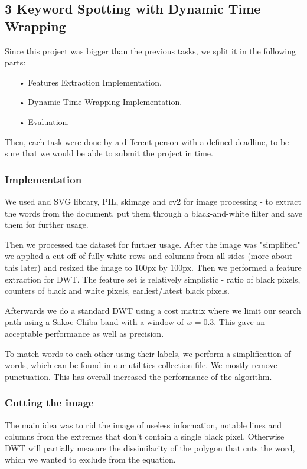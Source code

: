 \documentclass[12pt]{article}
\begin{document}
\subsection*{3 Keyword Spotting with Dynamic Time Wrapping}

Since this project was bigger than the previous tasks, we split it in the following parts:
\begin{enumerate}
\item[•]Features Extraction Implementation.
\item[•]Dynamic Time Wrapping Implementation.
\item[•]Evaluation.
\end{enumerate}
Then, each task were done by a different person with a defined deadline, to be sure that we would be able to submit the project in time.

\subsubsection*{Implementation}

We used and SVG library, PIL, skimage and cv2 for image processing - to extract the words from the document, put them through a black-and-white filter and save them for further usage.

Then we processed the dataset for further usage. After the image was "simplified" we applied a cut-off of fully white rows and columns from all sides (more about this later) and resized the image to 100px by 100px. Then we performed a feature extraction for DWT. The feature set is relatively simplistic - ratio of black pixels, counters of black and white pixels, earliest/latest black pixels.

Afterwards we do a standard DWT using a cost matrix where we limit our search path using a Sakoe-Chiba band with a window of $w = 0.3$. This gave an acceptable performance as well as precision.

To match words to each other using their labels, we perform a simplification of words, which can be found in our utilities collection file. We mostly remove punctuation. This has overall increased the performance of the algorithm.

\subsubsection*{Cutting the image}

The main idea was to rid the image of useless information, notable lines and columns from the extremes that don't contain a single black pixel. Otherwise DWT will partially measure the dissimilarity of the polygon that cuts the word, which we wanted to exclude from the equation.
\end{document}
